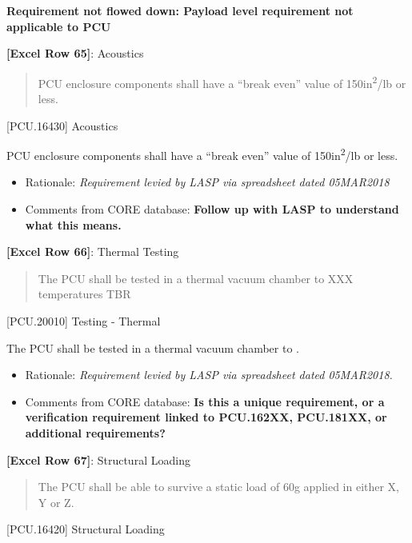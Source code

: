 \textbf{Requirement not flowed down: Payload level requirement not applicable to PCU}

\textbf{[Excel Row 65]}: Acoustics

\begin{quote}
PCU enclosure components shall have a ``break even'' value of 150in\textsuperscript{2}\slash lb or less.
\end{quote}

[PCU.16430] Acoustics

PCU enclosure components shall have a ``break even'' value of 150in\textsuperscript{2}\slash lb or less.

\begin{itemize}
\item{} Rationale: \emph{Requirement levied by LASP via spreadsheet dated 05MAR2018}

\item{} Comments from CORE database: \textbf{\textbf{Follow up with LASP to understand what this means.}}

\end{itemize}

\textbf{[Excel Row 66]}: Thermal Testing

\begin{quote}
The PCU shall be tested in a thermal vacuum chamber to XXX temperatures TBR
\end{quote}

[PCU.20010] Testing - Thermal

The PCU shall be tested in a thermal vacuum chamber to .

\begin{itemize}
\item{} Rationale: \emph{Requirement levied by LASP via spreadsheet dated 05MAR2018.}

\item{} Comments from CORE database: \textbf{Is this a unique requirement, or a verification requirement linked to PCU.162XX, PCU.181XX, or additional requirements?}

\end{itemize}

\textbf{[Excel Row 67]}: Structural Loading

\begin{quote}
The PCU shall be able to survive a static load of 60g applied in either X, Y or Z.
\end{quote}

[PCU.16420] Structural Loading

